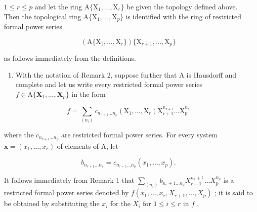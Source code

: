 \(1 \leqslant r \leqslant p\) and let the ring \(\mathrm{A}\{\mathrm{X}_1, \ldots, \mathrm{X}_r\}\) be given the topology defined above. Then the topological ring \(\mathrm{A}\{\mathrm{X}_1, \ldots, \mathrm{X}_p\}\) is identified with the ring of restricted formal power series

\[
(\mathrm{A} \{\mathrm{X} _ {1}, \dots , \mathrm{X} _ {r} \}) \{\mathrm{X} _ {r + 1}, \dots , \mathrm{X} _ {p} \}
\]

as follows immediately from the definitions.

\begin{enumerate}
\def\labelenumi{(\arabic{enumi})}
\setcounter{enumi}{2}
\tightlist
\item
  With the notation of Remark 2, suppose further that A is Hausdorff and complete and let us write every restricted formal power series \(f \in \mathrm{A}\{\mathbf{X}_1, \ldots, \mathbf{X}_p\}\) in the form
\end{enumerate}

\[
f = \sum_ {(n _ {i})} c _ {n _ {r + 1} \dots n _ {p}} (\mathrm{X} _ {1}, \dots , \mathrm{X} _ {r}) \mathrm{X} _ {r + 1} ^ {n _ {r + 1}} \dots \mathrm{X} _ {p} ^ {n _ {p}}
\]

where the \(c_{n_{r+1}\ldots n_p}\) are restricted formal power series. For every system \(\mathbf{x} = (x_1, \ldots, x_r)\) of elements of A, let

\[
b _ {n _ {r + 1} \dots n _ {p}} = c _ {n _ {r + 1} \dots n _ {p}} (x _ {1}, \dots , x _ {p}).
\]

It follows immediately from Remark 1 that \(\sum_{(n_i)} b_{n_r+1 \ldots n_p} X_{r+1}^{n_r+1} \ldots X_p^{n_p}\) is a restricted formal power series denoted by \(f(x_1, \ldots, x_r, X_{r+1}, \ldots, X_p)\) ; it is said to be obtained by substituting the \(x_i\) for the \(X_i\) for \(1 \leqslant i \leqslant r\) in \(f\) .

